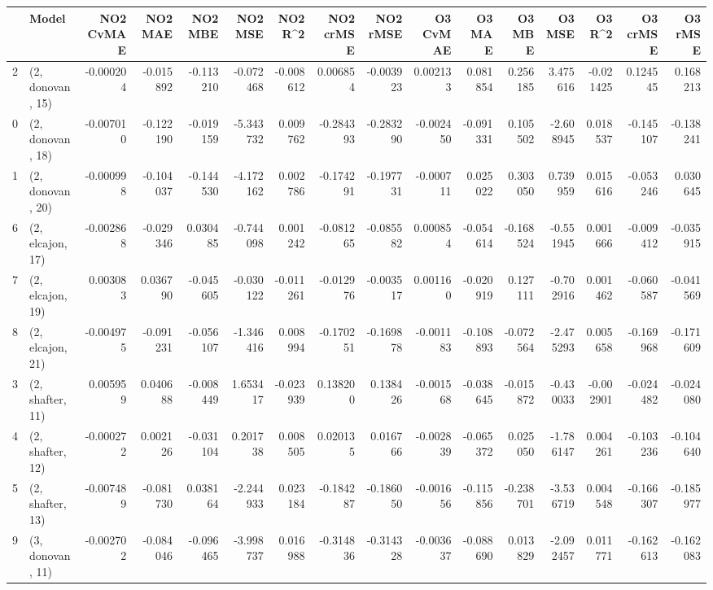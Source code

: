 \begin{tabular}{llrrrrrrrrrrrrrr}
\toprule
{} &             Model &  NO2 CvMAE &   NO2 MAE &   NO2 MBE &    NO2 MSE &   NO2 R\textasciicircum2 &  NO2 crMSE &  NO2 rMSE &  O3 CvMAE &    O3 MAE &    O3 MBE &     O3 MSE &    O3 R\textasciicircum2 &  O3 crMSE &   O3 rMSE \\
\midrule
2  &  (2, donovan, 15) &  -0.000204 & -0.015892 & -0.113210 &  -0.072468 & -0.008612 &   0.006854 & -0.003923 &  0.002133 &  0.081854 &  0.256185 &   3.475616 & -0.021425 &  0.124545 &  0.168213 \\
0  &  (2, donovan, 18) &  -0.007010 & -0.122190 & -0.019159 &  -5.343732 &  0.009762 &  -0.284393 & -0.283290 & -0.002450 & -0.091331 &  0.105502 &  -2.608945 &  0.018537 & -0.145107 & -0.138241 \\
1  &  (2, donovan, 20) &  -0.000998 & -0.104037 & -0.144530 &  -4.172162 &  0.002786 &  -0.174291 & -0.197731 & -0.000711 &  0.025022 &  0.303050 &   0.739959 &  0.015616 & -0.053246 &  0.030645 \\
6  &  (2, elcajon, 17) &  -0.002868 & -0.029346 &  0.030485 &  -0.744098 &  0.001242 &  -0.081265 & -0.085582 &  0.000854 & -0.054614 & -0.168524 &  -0.551945 &  0.001666 & -0.009412 & -0.035915 \\
7  &  (2, elcajon, 19) &   0.003083 &  0.036790 & -0.045605 &  -0.030122 & -0.011261 &  -0.012976 & -0.003517 &  0.001160 & -0.020919 &  0.127111 &  -0.702916 &  0.001462 & -0.060587 & -0.041569 \\
8  &  (2, elcajon, 21) &  -0.004975 & -0.091231 & -0.056107 &  -1.346416 &  0.008994 &  -0.170251 & -0.169878 & -0.001183 & -0.108893 & -0.072564 &  -2.475293 &  0.005658 & -0.169968 & -0.171609 \\
3  &  (2, shafter, 11) &   0.005959 &  0.040688 & -0.008449 &   1.653417 & -0.023939 &   0.138200 &  0.138426 & -0.001568 & -0.038645 & -0.015872 &  -0.430033 & -0.002901 & -0.024482 & -0.024080 \\
4  &  (2, shafter, 12) &  -0.000272 &  0.002126 & -0.031104 &   0.201738 &  0.008505 &   0.020135 &  0.016766 & -0.002839 & -0.065372 &  0.025050 &  -1.786147 &  0.004261 & -0.103236 & -0.104640 \\
5  &  (2, shafter, 13) &  -0.007489 & -0.081730 &  0.038164 &  -2.244933 &  0.023184 &  -0.184287 & -0.186050 & -0.001656 & -0.115856 & -0.238701 &  -3.536719 &  0.004548 & -0.166307 & -0.185977 \\
9  &  (3, donovan, 11) &  -0.002702 & -0.084046 & -0.096465 &  -3.998737 &  0.016988 &  -0.314836 & -0.314328 & -0.003637 & -0.088690 &  0.013829 &  -2.092457 &  0.011771 & -0.162613 & -0.162083 \\

\end{tabular}
